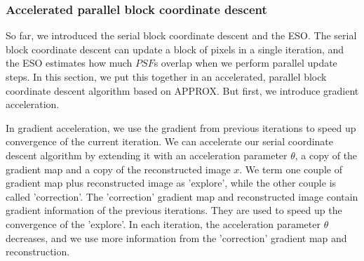 \subsubsection{Accelerated parallel block coordinate descent} \label{pcdm:pcdm:approx}
So far, we introduced the serial block coordinate descent and the ESO. The serial block coordinate descent can update a block of pixels in a single iteration, and the ESO estimates how much $PSF$s overlap when we perform parallel update steps. In this section, we put this together in an accelerated, parallel block coordinate descent algorithm based on APPROX\cite{fercoq2015accelerated}. But first, we introduce gradient acceleration.

In gradient acceleration, we use the gradient from previous iterations to speed up convergence of the current iteration. We can accelerate our serial coordinate descent algorithm by extending it with an acceleration parameter $\theta$, a copy of the gradient map and a copy of the reconstructed image $x$.  We term one couple of gradient map plus reconstructed image as 'explore', while the other couple is called 'correction'. The 'correction' gradient map and reconstructed image contain gradient information of the previous iterations. They are used to speed up the convergence of the 'explore'. In each iteration, the acceleration parameter $\theta$ decreases, and we use more information from the 'correction' gradient map and reconstruction.

